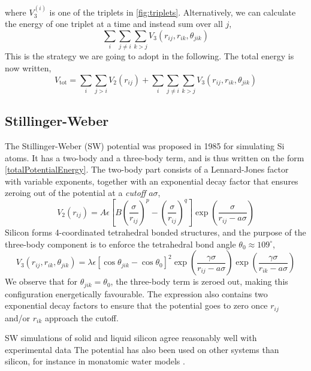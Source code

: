 \documentclass[twoside,english]{uiofysmaster}
\begin{document}
where $V_3^{(i)}$ is one of the triplets in \autoref{fig:triplets}. Alternatively, we can calculate the energy of one triplet 
at a time and instead sum over all $j$,
\begin{equation}
 \sum_{i}\sum_{j\neq i}\sum_{k>j} V_3 (r_{ij}, r_{ik}, \theta_{jik}) 
 \label{threeBodyPotentialEnergy2}
\end{equation}
This is the strategy we are going to adopt in the following. 
The total energy is now written,
\begin{equation}
 V_{\mathrm{tot}} = \sum_i\sum_{j>i} V_2(r_{ij}) + \sum_{i}\sum_{j\neq i}\sum_{k>j} V_3 (r_{ij}, r_{ik}, \theta_{jik}) 
 \label{totalPotentialEnergy}
\end{equation}


\subsection{Stillinger-Weber}
The Stillinger-Weber (SW) potential was proposed in 1985 \cite{Stillinger85} for simulating Si atoms. It has a two-body
and a three-body term, and is thus written on the form \eqref{totalPotentialEnergy}. 
The two-body part consists of a Lennard-Jones factor with variable exponents, together with an exponential decay factor
that ensures zeroing out of the potential at a \textit{cutoff} $a\sigma$,
\begin{equation}
 V_2(r_{ij}) = A\epsilon\left[B\left(\frac{\sigma}{r_{ij}}\right)^p - 
 \left(\frac{\sigma}{r_{ij}}\right)^q\right] \exp\left(\frac{\sigma}{r_{ij} - a\sigma}\right)
\end{equation}
Silicon forms 4-coordinated
tetrahedral bonded structures, and the purpose of the three-body component is to enforce the tetrahedral bond angle
$\theta_0 \approx 109^\circ$, 
\begin{equation}
 V_3(r_{ij}, r_{ik}, \theta_{jik}) = \lambda\epsilon[\cos\theta_{jik} - \cos\theta_0]^2
 \exp\left(\frac{\gamma\sigma}{r_{ij} - a\sigma}\right)\exp\left(\frac{\gamma\sigma}{r_{ik} - a\sigma}\right)
\end{equation}
We observe that for $\theta_{jik} = \theta_0$, the three-body term is zeroed out, making this configuration energetically 
favourable. The expression also contains two exponential decay factors to ensure that the potential goes 
to zero once $r_{ij}$ and/or $r_{ik}$ approach the cutoff. 

SW simulations of solid and liquid silicon agree reasonably well with experimental data \cite{Stillinger85}
The potential has also been used on other systems than silicon, for instance in monatomic water models \cite{Molinero08}. 
\end{document}
